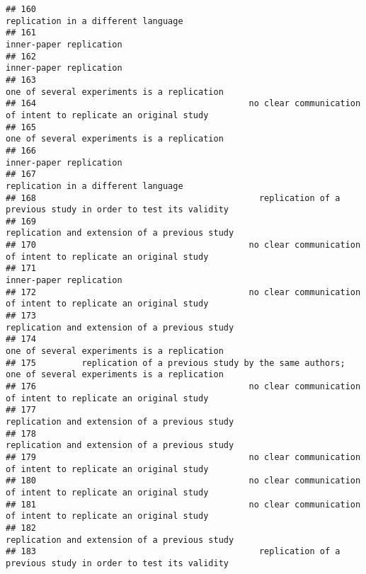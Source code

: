 \documentclass[
  english,
  man]{apa6}
\begin{document}
\begin{verbatim}
## 160                                                                      replication in a different language
## 161                                                                                  inner-paper replication
## 162                                                                                  inner-paper replication
## 163                                                              one of several experiments is a replication
## 164                                          no clear communication of intent to replicate an original study
## 165                                                              one of several experiments is a replication
## 166                                                                                  inner-paper replication
## 167                                                                      replication in a different language
## 168                                            replication of a previous study in order to test its validity
## 169                                                            replication and extension of a previous study
## 170                                          no clear communication of intent to replicate an original study
## 171                                                                                  inner-paper replication
## 172                                          no clear communication of intent to replicate an original study
## 173                                                            replication and extension of a previous study
## 174                                                              one of several experiments is a replication
## 175         replication of a previous study by the same authors; one of several experiments is a replication
## 176                                          no clear communication of intent to replicate an original study
## 177                                                            replication and extension of a previous study
## 178                                                            replication and extension of a previous study
## 179                                          no clear communication of intent to replicate an original study
## 180                                          no clear communication of intent to replicate an original study
## 181                                          no clear communication of intent to replicate an original study
## 182                                                            replication and extension of a previous study
## 183                                            replication of a previous study in order to test its validity

\end{verbatim}
\end{document}
